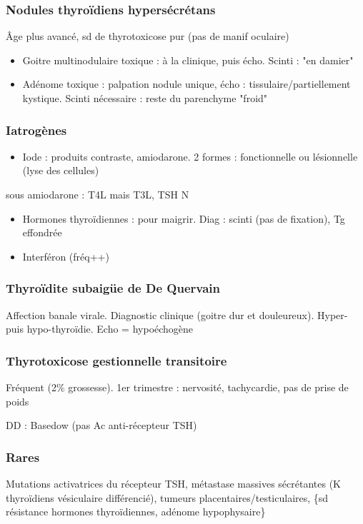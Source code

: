 \documentclass{book}
\begin{document}
\subsubsection{Nodules thyroïdiens hypersécrétans}
\label{sec:orgf4301b7}
Âge plus avancé, sd de thyrotoxicose pur (pas de manif oculaire) 
\begin{itemize}
\item Goitre multinodulaire toxique : à la clinique, puis écho. Scinti : "en damier"
\item Adénome toxique : palpation nodule unique, écho : tissulaire/partiellement
kystique. Scinti nécessaire : reste du parenchyme "froid"
\end{itemize}

\subsubsection{Iatrogènes}
\label{sec:org02f1b4f}
\begin{itemize}
\item Iode : produits contraste, amiodarone. 2 formes : fonctionnelle ou lésionnelle
(lyse des cellules)
\end{itemize}
\danger sous amiodarone : T4L \inc mais T3L, TSH N 
\begin{itemize}
\item Hormones thyroïdiennes : pour maigrir. Diag : scinti (pas de fixation), Tg
effondrée
\item Interféron (fréq++)
\end{itemize}

\subsubsection{Thyroïdite subaigüe de De Quervain}
\label{sec:orgabfcb94}
Affection banale virale. Diagnostic clinique (goitre dur et douleureux). Hyper-
puis hypo-thyroïdie. Echo = hypoéchogène

\subsubsection{Thyrotoxicose gestionnelle transitoire}
\label{sec:orgfd2a196}
Fréquent (2\% grossesse). 1er trimestre : nervosité, tachycardie, pas de prise de
poids

DD : Basedow (pas Ac anti-récepteur TSH)

\subsubsection{Rares}
\label{sec:orgbc86c32}
Mutations activatrices du récepteur TSH, métastase massives sécrétantes (K
thyroïdiens vésiculaire différencié), tumeurs placentaires/testiculaires, \{sd
résistance hormones thyroïdiennes, adénome hypophysaire\}
\end{document}
